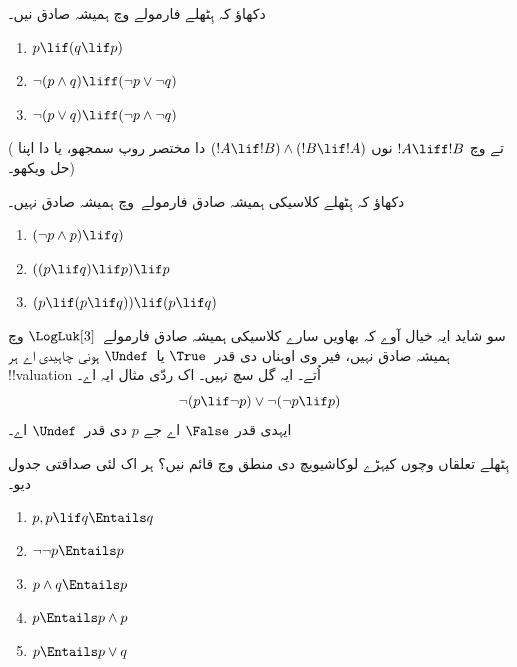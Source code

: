 \documentclass[../../../include/open-logic-section]{subfiles}
\begin{document}
\begin{prob}
  دکھاؤ کہ ہِٹھلے فارمولے \LogLuk[3] وچ ہمیشہ صادق نیں۔
  \begin{enumerate}
    \item $p \lif (q \lif p)$
    \item\label{mvl:thr:luk:prob:luk-taut-2} $\lnot(p \land q) \liff (\lnot p \lor \lnot q)$
    \item\label{mvl:thr:luk:prob:luk-taut-3} $\lnot(p \lor q) \liff (\lnot p \land \lnot q)$
  \end{enumerate}
  ( تے
   وچ $!A \liff !B$
  نوں $(!A \lif !B) \land (!B \lif !A)$ دا مختصر روپ سمجھو،
  یا  دا اپنا حل ویکھو۔)
\end{prob}

\begin{prob}
  دکھاؤ کہ ہِٹھلے کلاسیکی ہمیشہ صادق فارمولے~\LogLuk[3] وچ
  ہمیشہ صادق نہیں۔
  \begin{enumerate}
    \item $(\lnot p \land p) \lif q)$
    \item $((p \lif q) \lif p) \lif p$
    \item $(p \lif (p \lif q)) \lif (p \lif q)$
  \end{enumerate}
\end{prob}

سو شاید ایہ خیال آوے کہ بھاویں سارے کلاسیکی ہمیشہ صادق
فارمولے~$\LogLuk[3]$ وچ ہمیشہ صادق نہیں، فیر وی اوہناں دی قدر~$\True$ یا~$\Undef$ ہونی چاہیدی اے
ہر !!{valuation} اُتے۔ ایہ گل سچ نہیں۔ اک ردّی مثال ایہ اے۔
\[
  \lnot(p \lif \lnot p) \lor \lnot(\lnot p \lif p)
\]
ایہدی قدر $\False$ اے جے $p$ دی قدر~$\Undef$ اے۔

\begin{prob}
  ہِٹھلے تعلقاں وچوں کیہڑے لوکاشیویچ دی منطق وچ قائم نیں؟
  ہر اک لئی صداقتی جدول دیو۔
  \begin{enumerate}
    \item $p, p \lif q \Entails q$
    \item $\lnot\lnot p \Entails p$
    \item $p \land q \Entails p$
    \item $p \Entails p \land p$
    \item $p \Entails p \lor q$
  \end{enumerate}
\end{prob}
\end{document}
